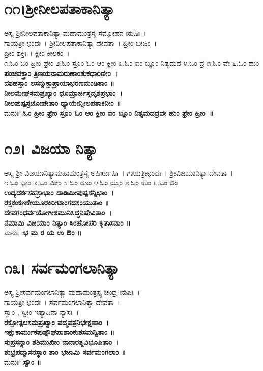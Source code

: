 \section{೧೧।ಶ್ರೀನೀಲಪತಾಕಾನಿತ್ಯಾ}
ಅಸ್ಯ ಶ್ರೀನೀಲಪತಾಕಾನಿತ್ಯಾ ಮಹಾಮಂತ್ರಸ್ಯ ಸಮ್ಮೋಹನ ಋಷಿಃ~। \\ಗಾಯತ್ರೀ ಛಂದಃ~। ಶ್ರೀನೀಲಪತಾಕಾನಿತ್ಯಾ ದೇವತಾ~। ಹ್ರೀಂ ಬೀಜಂ~।\\ ಹ್ರೀಂ ಶಕ್ತಿಃ~। ಕ್ಲೀಂ ಕೀಲಕಂ~।\\
೧.ಓಂ ಓಂ ಹ್ರೀಂ ಫ್ರೇಂ ೨.ಓಂ ಸ್ರೂಂ ಓಂ ಆಂ ಕ್ಲೀಂ ೩.ಓಂ ಐಂ ಬ್ಲೂಂ ನಿತ್ಯಮದ ೪.ಓಂ ದ್ರ ೫.ಓಂ ವೇ ೬.ಓಂ ಹುಂ \\
{\bfseries ಪಂಚವಕ್ತ್ರಾಂ ತ್ರಿಣಯನಾಮರುಣಾಂಶುಕಧಾರಿಣೀಂ~।\\
ದಶಹಸ್ತಾಂ ಲಸನ್ಮುಕ್ತಾಪ್ರಾಯಾಭರಣಮಂಡಿತಾಂ ॥\\
ನೀಲಮೇಘಸಮಪ್ರಖ್ಯಾಂ ಧೂಮ್ರಾರ್ಚಿಸ್ಸದೃಶಪ್ರಭಾಂ~।\\
ನೀಲಪುಷ್ಪಸ್ರಜೋಪೇತಾಂ ಧ್ಯಾಯೇನ್ನೀಲಪತಾಕಿನೀಂ ॥\\}
ಮನುಃ :{\bfseries ಓಂ ಹ್ರೀಂ ಫ್ರೇಂ ಸ್ರೂಂ ಓಂ ಆಂ ಕ್ಲೀಂ ಐಂ ಬ್ಲೂಂ ನಿತ್ಯಮದದ್ರವೇ ಹುಂ ಫ್ರೇಂ ಹ್ರೀಂ~॥}
\section{೧೨। ವಿಜಯಾ ನಿತ್ಯಾ}
ಅಸ್ಯ ಶ್ರೀ ವಿಜಯಾನಿತ್ಯಾಮಹಾಮಂತ್ರಸ್ಯ ಅಹಿರ್ಋಷಿಃ~। ಗಾಯತ್ರೀಛಂದಃ~। ಶ್ರೀವಿಜಯಾನಿತ್ಯಾ ದೇವತಾ~।\\
೧.ಓಂ ಭಾಂ ೨.ಓಂ ಮೀಂ ೩.ಓಂ ರೂಂ ೪.ಓಂ ಯೈಂ ೫.ಓಂ ಉಂ ೬.ಓಂ ಔಂ \\
{\bfseries ಉದ್ಯದರ್ಕಸಹಸ್ರಾಭಾಂ ದಾಡಿಮೀಪುಷ್ಪಸನ್ನಿಭಾಂ~।\\
ರಕ್ತಕಂಕಣಕೇಯೂರಕಿರೀಟಾಂಗದಸಂಯುತಾಂ ॥\\
ದೇವಗಂಧರ್ವಯೋಗೀಶಮುನಿಸಿದ್ಧನಿಷೇವಿತಾಂ~।\\
ನಮಾಮಿ ವಿಜಯಾಂ ನಿತ್ಯಾಂ ಸಿಂಹೋಪರಿ ಕೃತಾಸನಾಂ ॥\\}
ಮನುಃ :{\bfseries  ಭ ಮ ರ ಯ ಉ ಔಂ ॥}
\section{೧೩। ಸರ್ವಮಂಗಲಾನಿತ್ಯಾ}
ಅಸ್ಯ ಶ್ರೀಸರ್ವಮಂಗಲಾನಿತ್ಯಾ ಮಹಾಮಂತ್ರಸ್ಯ ಚಂದ್ರ ಋಷಿಃ~।\\ ಗಾಯತ್ರೀ ಛಂದಃ~। ಸರ್ವಮಂಗಲಾನಿತ್ಯಾ ದೇವತಾ~।\\
ಸ್ವಾಂ , ಸ್ವೀಂ ಇತ್ಯಾದಿನಾ ನ್ಯಾಸಃ~।\\
{\bfseries ರಕ್ತೋತ್ಪಲಸಮಪ್ರಖ್ಯಾಂ ಪದ್ಮಪತ್ರನಿಭೇಕ್ಷಣಾಂ~।\\
ಇಕ್ಷುಕಾರ್ಮುಕಪುಷ್ಪೌಘಪಾಶಾಂಕುಶಸಮನ್ವಿತಾಂ ॥\\
ಸುಪ್ರಸನ್ನಾಂ ಶಶಿಮುಖೀಂ ನಾನಾರತ್ನವಿಭೂಷಿತಾಂ~।\\
ಶುಭ್ರಪದ್ಮಾಸನಸ್ಥಾಂ ತಾಂ ಭಜಾಮಿ ಸರ್ವಮಂಗಲಾಂ ॥\\}
ಮನುಃ :{\bfseries  ಸ್ವೌಂ ॥}

